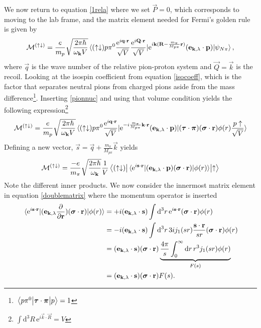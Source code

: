 We now return to equation \ref{1rela} where we set $\vec{P}=0$, which corresponds to moving to the lab frame, and the matrix element needed for Fermi's golden rule is given by
\begin{equation}\label{MatrixSpinupdown} 
	\mathcal{M}^{(\uparrow\downarrow)} = \frac{e}{m_p} \sqrt{\frac{2\pi\hbar}{\omega_{\bm{\mathrm{k}}}V}} \mel*{(\uparrow\downarrow)p\pi^0 \frac{\text{e}^{i\bm{\mathrm{q}}\cdot \bm{\mathrm{r}}}}{\sqrt{V}}\frac{\text{e}^{i\bm{\mathrm{Q}}\cdot \bm{\mathrm{r}}}}{\sqrt{V}}}{\text{e}^{i\bm{\mathrm{k}}(\bm{\mathrm{R}}-\frac{m_\pi}{M_{p\pi}}\bm{\mathrm{r}})}(\bm{\mathrm{e}}_{\bm{\mathrm{k}},\lambda}\cdot\bm{\mathrm{p}})}{\psi_{N\pi}} ,
\end{equation}
where $\vec{q}$ is the wave number of the relative pion-proton system and $\vec{Q}=\vec{k}$ is the recoil. Looking at the isospin coefficient from equation \eqref{isocoeff}, which is the factor that separates neutral pions from charged pions aside from the mass difference\footnote{$\mel{p\pi^0}{\bm{\mathrm{\tau}}\cdot\bm{\mathrm{\pi}}}{p}=1$}. Inserting \eqref{pionnuc} and using that volume condition yields the following expression\footnote{$\int \text{d}^3R \, \text{e}^{i\vec{k}\cdot\vec{R}}=V$}
\begin{equation} \label{MatrixSpinupdown2}
	\mathcal{M}^{(\uparrow\downarrow)} = \frac{e}{m_p} \sqrt{\frac{2\pi\hbar}{\omega_{\bm{\mathrm{k}}}V}} \mel*{(\uparrow\downarrow)p\pi^0 \frac{\text{e}^{i\bm{\mathrm{q}}\cdot \bm{\mathrm{r}}}}{\sqrt{V}}}{\text{e}^{-i\frac{m_\pi}{M_{p\pi}}\bm{\mathrm{k}}\cdot\bm{\mathrm{r}}}(\bm{\mathrm{e}}_{\bm{\mathrm{k}},\lambda}\cdot\bm{\mathrm{p}})}{(\bm{\mathrm{\tau}}\cdot\bm{\mathrm{\pi}})(\bm{\mathrm{\sigma}}\cdot\bm{\mathrm{r}})\phi(r) \frac{p\uparrow}{\sqrt{V}}} 
\end{equation}
Defining a new vector, $\vec{s}=\vec{q}+\frac{m_\pi}{M_{p\pi}}\vec{k}$ yields
\begin{equation}\label{doublematrix}
	\mathcal{M}^{(\uparrow\downarrow)} = \frac{-e}{m_\pi} \sqrt{\frac{2\pi\hbar}{\omega_{\bm{\mathrm{k}}}}} \frac{1}{V} \mel{(\uparrow \downarrow)}{\mel*{\text{e}^{i\bm{\mathrm{s}}\cdot\bm{\mathrm{r}}}}{(\bm{\mathrm{e}}_{\bm{\mathrm{k}},\lambda}\cdot\bm{\mathrm{p}})(\bm{\mathrm{\sigma}}\cdot\bm{\mathrm{r}})}{\phi(r)}}{\uparrow}
\end{equation}
Note the different inner products. We now consider the innermost matrix element in equation \eqref{doublematrix} where the momentum operator is inserted
\begin{align}
	\mel*{\text{e}^{i\bm{\mathrm{s}}\cdot\bm{\mathrm{r}}}}{(\bm{\mathrm{e}}_{\bm{\mathrm{k}},\lambda}\frac{\partial}{\partial \bm{\mathrm{r}}})(\bm{\mathrm{\sigma}}\cdot \bm{\mathrm{r}})}{\phi(r)} &=+i(\bm{\mathrm{e}}_{\bm{\mathrm{k}},\lambda}\cdot \bm{\mathrm{s}}) \int \text{d}^3 r \, \text{e}^{i\bm{\mathrm{s}}\cdot\bm{\mathrm{r}}}(\bm{\mathrm{\sigma}}\cdot \bm{\mathrm{r}}) \phi(r) \\ 
	&= -i(\bm{\mathrm{e}}_{\bm{\mathrm{k}},\lambda}\cdot \bm{\mathrm{s}}) \int \text{d}^3 r \, 3 i j_1(sr) \frac{\bm{\mathrm{s}}\cdot \bm{\mathrm{r}}}{sr}(\bm{\mathrm{\sigma}}\cdot \bm{\mathrm{r}}) \phi(r)  \label{planebob}\\
	&= (\bm{\mathrm{e}}_{\bm{\mathrm{k}},\lambda}\cdot \bm{\mathrm{s}})(\bm{\mathrm{\sigma}}\cdot \bm{\mathrm{r}}) \underbrace{\frac{4\pi}{s} \int_0^\infty \text{d}r \, r^3 j_1(sr) \phi(r)}_{F(s)} \label{unitbob} \\
	&= (\bm{\mathrm{e}}_{\bm{\mathrm{k}},\lambda}\cdot \bm{\mathrm{s}})(\bm{\mathrm{\sigma}}\cdot \bm{\mathrm{r}}) F(s).
\end{align}
